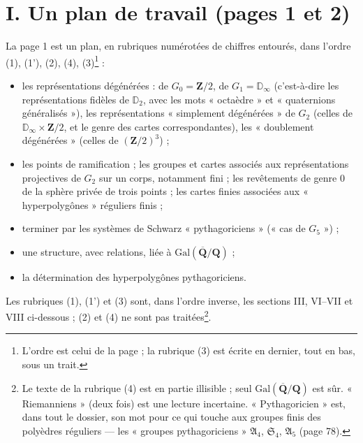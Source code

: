 \documentclass[11pt,a4paper]{article}
\begin{document}
\section*{I. Un plan de travail (pages 1 et 2)}

La page 1 est un plan, en rubriques numérotées de chiffres entourés, dans
l'ordre (1), (1'), (2), (4), (3)\footnote{L'ordre est celui de la page ; la
rubrique (3) est écrite en dernier, tout en bas, sous un trait.} :
\begin{itemize}
  \item[(1)] les représentations dégénérées : de $G_0 = \mathbf{Z}/2$, de
    $G_1 = \mathbb{D}_\infty$ (c'est-à-dire les représentations fidèles de
    $\mathbb{D}_2$, avec les mots « octaèdre » et « quaternions
    généralisés »), les représentations « simplement dégénérées » de $G_2$
    (celles de $\mathbb{D}_\infty \times \mathbf{Z}/2$, et le genre des cartes
    correspondantes), les « doublement dégénérées » (celles de
    $(\mathbf{Z}/2)^3$) ;
  \item[(1')] les points de ramification ; les groupes et cartes associés aux
    représentations projectives de $G_2$ sur un corps, notamment fini ; les
    revêtements de genre $0$ de la sphère privée de trois points ; les cartes
    finies associées aux « hyperpolygônes » réguliers finis ;
  \item[(2)] terminer par les systèmes de Schwarz « pythagoriciens » (« cas de
    $G_5$ ») ;
  \item[(4)] une structure, avec relations, liée à
    $\mathrm{Gal}(\overline{\mathbf{Q}}/\mathbf{Q})$ ;
  \item[(3)] la détermination des hyperpolygônes pythagoriciens.
\end{itemize}
Les rubriques (1), (1') et (3) sont, dans l'ordre inverse, les sections III,
VI--VII et VIII ci-dessous ; (2) et (4) ne sont pas traitées\footnote{Le
texte de la rubrique (4) est en partie illisible ; seul
$\mathrm{Gal}(\overline{\mathbf{Q}}/\mathbf{Q})$ est sûr. « Riemanniens » (deux
fois) est une lecture incertaine. « Pythagoricien » est, dans tout le dossier,
son mot pour ce qui touche aux groupes finis des polyèdres réguliers --- les
« groupes pythagoriciens » $\mathfrak{A}_4$, $\mathfrak{S}_4$,
$\mathfrak{A}_5$ (page 78).}.
\end{document}
